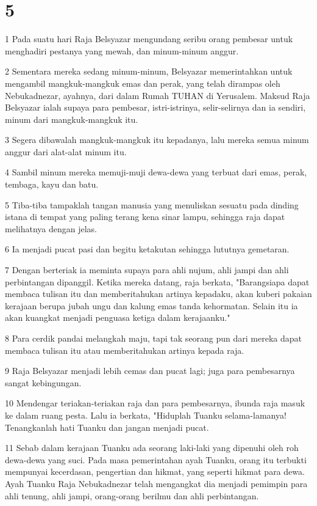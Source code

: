 \chapter{5}

\par 1 Pada suatu hari Raja Belsyazar mengundang seribu orang pembesar untuk menghadiri pestanya yang mewah, dan minum-minum anggur.
\par 2 Sementara mereka sedang minum-minum, Belsyazar memerintahkan untuk mengambil mangkuk-mangkuk emas dan perak, yang telah dirampas oleh Nebukadnezar, ayahnya, dari dalam Rumah TUHAN di Yerusalem. Maksud Raja Belsyazar ialah supaya para pembesar, istri-istrinya, selir-selirnya dan ia sendiri, minum dari mangkuk-mangkuk itu.
\par 3 Segera dibawalah mangkuk-mangkuk itu kepadanya, lalu mereka semua minum anggur dari alat-alat minum itu.
\par 4 Sambil minum mereka memuji-muji dewa-dewa yang terbuat dari emas, perak, tembaga, kayu dan batu.
\par 5 Tiba-tiba tampaklah tangan manusia yang menuliskan sesuatu pada dinding istana di tempat yang paling terang kena sinar lampu, sehingga raja dapat melihatnya dengan jelas.
\par 6 Ia menjadi pucat pasi dan begitu ketakutan sehingga lututnya gemetaran.
\par 7 Dengan berteriak ia meminta supaya para ahli nujum, ahli jampi dan ahli perbintangan dipanggil. Ketika mereka datang, raja berkata, "Barangsiapa dapat membaca tulisan itu dan memberitahukan artinya kepadaku, akan kuberi pakaian kerajaan berupa jubah ungu dan kalung emas tanda kehormatan. Selain itu ia akan kuangkat menjadi penguasa ketiga dalam kerajaanku."
\par 8 Para cerdik pandai melangkah maju, tapi tak seorang pun dari mereka dapat membaca tulisan itu atau memberitahukan artinya kepada raja.
\par 9 Raja Belsyazar menjadi lebih cemas dan pucat lagi; juga para pembesarnya sangat kebingungan.
\par 10 Mendengar teriakan-teriakan raja dan para pembesarnya, ibunda raja masuk ke dalam ruang pesta. Lalu ia berkata, "Hiduplah Tuanku selama-lamanya! Tenangkanlah hati Tuanku dan jangan menjadi pucat.
\par 11 Sebab dalam kerajaan Tuanku ada seorang laki-laki yang dipenuhi oleh roh dewa-dewa yang suci. Pada masa pemerintahan ayah Tuanku, orang itu terbukti mempunyai kecerdasan, pengertian dan hikmat, yang seperti hikmat para dewa. Ayah Tuanku Raja Nebukadnezar telah mengangkat dia menjadi pemimpin para ahli tenung, ahli jampi, orang-orang berilmu dan ahli perbintangan.
